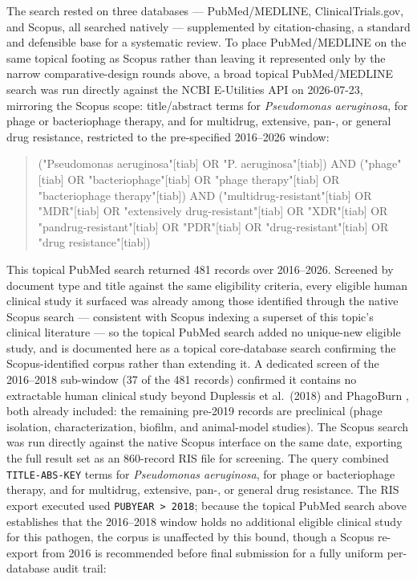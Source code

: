 The search rested on three databases --- PubMed/MEDLINE, ClinicalTrials.gov, and Scopus, all searched natively --- supplemented by citation-chasing, a standard and defensible base for a systematic review. To place PubMed/MEDLINE on the same topical footing as Scopus rather than leaving it represented only by the narrow comparative-design rounds above, a broad topical PubMed/MEDLINE search was run directly against the NCBI E-Utilities API on 2026-07-23, mirroring the Scopus scope: title/abstract terms for \textit{Pseudomonas aeruginosa}, for phage or bacteriophage therapy, and for multidrug, extensive, pan-, or general drug resistance, restricted to the pre-specified 2016--2026 window:

\begin{quote}
\footnotesize\ttfamily
("Pseudomonas aeruginosa"[tiab] OR "P. aeruginosa"[tiab]) AND ("phage"[tiab] OR "bacteriophage"[tiab] OR "phage therapy"[tiab] OR "bacteriophage therapy"[tiab]) AND ("multidrug-resistant"[tiab] OR "MDR"[tiab] OR "extensively drug-resistant"[tiab] OR "XDR"[tiab] OR "pandrug-resistant"[tiab] OR "PDR"[tiab] OR "drug-resistant"[tiab] OR "drug resistance"[tiab])
\end{quote}

\noindent This topical PubMed search returned 481 records over 2016--2026. Screened by document type and title against the same eligibility criteria, every eligible human clinical study it surfaced was already among those identified through the native Scopus search --- consistent with Scopus indexing a superset of this topic's clinical literature --- so the topical PubMed search added no unique-new eligible study, and is documented here as a topical core-database search confirming the Scopus-identified corpus rather than extending it. A dedicated screen of the 2016--2018 sub-window (37 of the 481 records) confirmed it contains no extractable human clinical study beyond Duplessis et al.\ (2018) and PhagoBurn \parencite{Jault2019_phagoburn}, both already included: the remaining pre-2019 records are preclinical (phage isolation, characterization, biofilm, and animal-model studies). The Scopus search was run directly against the native Scopus interface on the same date, exporting the full result set as an 860-record RIS file for screening. The query combined \texttt{TITLE-ABS-KEY} terms for \textit{Pseudomonas aeruginosa}, for phage or bacteriophage therapy, and for multidrug, extensive, pan-, or general drug resistance. The RIS export executed used \texttt{PUBYEAR > 2018}; because the topical PubMed search above establishes that the 2016--2018 window holds no additional eligible clinical study for this pathogen, the corpus is unaffected by this bound, though a Scopus re-export from 2016 is recommended before final submission for a fully uniform per-database audit trail:


